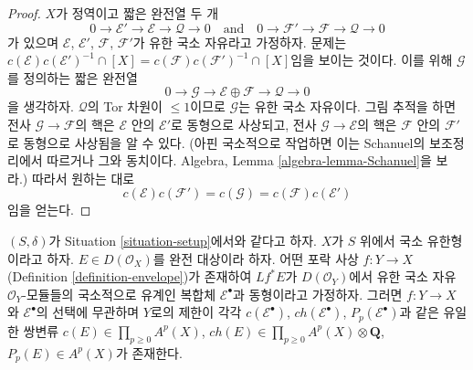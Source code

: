 \begin{proof}
\medskip\noindent
$X$가 정역이고 짧은 완전열 두 개
$$
0 \to \mathcal{E}' \to \mathcal{E} \to \mathcal{Q} \to 0
\quad\text{and}\quad
0 \to \mathcal{F}' \to \mathcal{F} \to \mathcal{Q} \to 0
$$
가 있으며 $\mathcal{E}$, $\mathcal{E}'$, $\mathcal{F}$,
$\mathcal{F}'$가 유한 국소 자유라고 가정하자. 문제는
$c(\mathcal{E})c(\mathcal{E}')^{-1} \cap [X] =
c(\mathcal{F})c(\mathcal{F}')^{-1} \cap [X]$임을 보이는 것이다.
이를 위해 $\mathcal{G}$를 정의하는 짧은 완전열
$$
0 \to \mathcal{G} \to \mathcal{E} \oplus \mathcal{F} \to \mathcal{Q} \to 0
$$
을 생각하자. $\mathcal{Q}$의 Tor 차원이 $\leq 1$이므로
$\mathcal{G}$는 유한 국소 자유이다. 그림 추적을 하면 전사
$\mathcal{G} \to \mathcal{F}$의 핵은 $\mathcal{E}$ 안의
$\mathcal{E}'$로 동형으로 사상되고, 전사 $\mathcal{G} \to \mathcal{E}$의
핵은 $\mathcal{F}$ 안의 $\mathcal{F}'$로 동형으로 사상됨을 알 수 있다.
(아핀 국소적으로 작업하면 이는 Schanuel의 보조정리에서 따르거나 그와
동치이다. Algebra, Lemma \ref{algebra-lemma-Schanuel}을 보라.)
따라서 원하는 대로
$$
c(\mathcal{E})c(\mathcal{F}') = c(\mathcal{G}) =
c(\mathcal{F})c(\mathcal{E}')
$$
임을 얻는다.
\end{proof}

\begin{lemma}
\label{lemma-defined-by-envelope}
$(S, \delta)$가 Situation \ref{situation-setup}에서와 같다고 하자.
$X$가 $S$ 위에서 국소 유한형이라고 하자. $E \in D(\mathcal{O}_X)$를
완전 대상이라 하자. 어떤 포락 사상
$f : Y \to X$ (Definition \ref{definition-envelope})가 존재하여
$Lf^*E$가 $D(\mathcal{O}_Y)$에서 유한 국소 자유
$\mathcal{O}_Y$-모듈들의 국소적으로 유계인 복합체
$\mathcal{E}^\bullet$과 동형이라고 가정하자. 그러면
$f : Y \to X$와 $\mathcal{E}^\bullet$의 선택에 무관하며 $Y$로의
제한이 각각 $c(\mathcal{E}^\bullet)$,
$ch(\mathcal{E}^\bullet)$, $P_p(\mathcal{E}^\bullet)$과 같은 유일한
쌍변류
$c(E) \in \prod_{p \geq 0} A^p(X)$,
$ch(E) \in \prod_{p \geq 0} A^p(X) \otimes \mathbf{Q}$,
$P_p(E) \in A^p(X)$가 존재한다.
\end{lemma}


